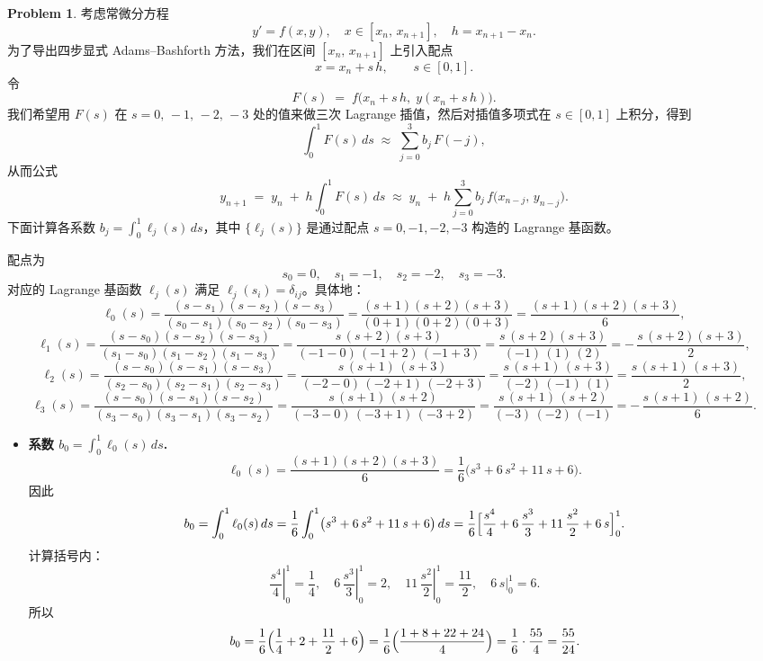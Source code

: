 \documentclass[a4paper]{article}
\theoremstyle{definition}
\newtheorem{problem}{Problem}
\theoremstyle{plain}
\newcommand{\<}{\left<}
\renewcommand{\>}{\right>}
\numberwithin{equation}{problem}
\begin{document}
\begin{problem}
    考虑常微分方程 
\[
y' = f(x,y), \quad x \in [x_n,\,x_{n+1}], \quad h = x_{n+1} - x_n.
\]
为了导出四步显式 Adams–Bashforth 方法，我们在区间 $[x_n,\,x_{n+1}]$ 上引入配点
\[
x = x_n + s\,h,\qquad s \in [0,1].
\]
令
\[
F(s) \;=\; f\bigl(x_n + s\,h,\;y(x_n + s\,h)\bigr).
\]
我们希望用 $F(s)$ 在 $s = 0,\,-1,\,-2,\,-3$ 处的值来做三次 Lagrange 插值，然后对插值多项式在 $s\in[0,1]$ 上积分，得到
\[
\int_{0}^{1} F(s)\,ds
\;\approx\;
\sum_{j=0}^{3} b_j\,F(-\,j),
\]
从而公式
\[
y_{n+1} \;=\; y_n \;+\; h \int_{0}^{1} F(s)\,ds
\;\approx\;
y_n \;+\; h \sum_{j=0}^{3} b_j\,f\bigl(x_{n-j},\,y_{n-j}\bigr).
\]
下面计算各系数 $b_j = \displaystyle\int_{0}^{1} \ell_j(s)\,ds$，其中 $\{\ell_j(s)\}$ 是通过配点 $s=0,-1,-2,-3$ 构造的 Lagrange 基函数。

\medskip



配点为
\[
s_0 = 0,\quad s_1 = -1,\quad s_2 = -2,\quad s_3 = -3.
\]
对应的 Lagrange 基函数 $\ell_j(s)$ 满足 $\ell_j(s_i) = \delta_{ij}$。具体地：
\[
\ell_0(s)
= \frac{(s - s_1)(s - s_2)(s - s_3)}{(s_0 - s_1)(s_0 - s_2)(s_0 - s_3)}
= \frac{(s + 1)(s + 2)(s + 3)}{(0 + 1)(0 + 2)(0 + 3)}
= \frac{(s + 1)(s + 2)(s + 3)}{6},
\]
\[
\ell_1(s)
= \frac{(s - s_0)(s - s_2)(s - s_3)}{(s_1 - s_0)(s_1 - s_2)(s_1 - s_3)}
= \frac{s\,(s + 2)(s + 3)}{(-1 - 0)\,(-1 + 2)\,(-1 + 3)}
= \frac{s\,(s + 2)(s + 3)}{(-1)\,(1)\,(2)}
= -\,\frac{s\,(s + 2)(s + 3)}{2},
\]
\[
\ell_2(s)
= \frac{(s - s_0)(s - s_1)(s - s_3)}{(s_2 - s_0)(s_2 - s_1)(s_2 - s_3)}
= \frac{s\,(s + 1)\,(s + 3)}{(-2 - 0)\,(-2 + 1)\,(-2 + 3)}
= \frac{s\,(s + 1)\,(s + 3)}{(-2)\,(-1)\,(1)}
= \frac{s\,(s + 1)\,(s + 3)}{2},
\]
\[
\ell_3(s)
= \frac{(s - s_0)(s - s_1)(s - s_2)}{(s_3 - s_0)(s_3 - s_1)(s_3 - s_2)}
= \frac{s\,(s + 1)\,(s + 2)}{(-3 - 0)\,(-3 + 1)\,(-3 + 2)}
= \frac{s\,(s + 1)\,(s + 2)}{(-3)\,(-2)\,(-1)}
= -\,\frac{s\,(s + 1)\,(s + 2)}{6}.
\]

\medskip
 

\begin{itemize}
  \item \textbf{系数 $b_0 = \displaystyle\int_{0}^{1} \ell_0(s)\,ds$.}  
    \[
    \ell_0(s) = \frac{(s + 1)(s + 2)(s + 3)}{6}
    = \frac{1}{6}\bigl(s^3 + 6\,s^2 + 11\,s + 6\bigr).
    \]
    因此
    \[
    b_0 
    = \int_{0}^{1} \ell_0(s)\,ds
    = \frac{1}{6} \int_{0}^{1} \bigl(s^3 + 6\,s^2 + 11\,s + 6\bigr)\,ds
    = \frac{1}{6} \Bigl[
       \frac{s^4}{4} + 6\,\frac{s^3}{3} + 11\,\frac{s^2}{2} + 6\,s
    \Bigr]_{0}^{1}.
    \]
    计算括号内：
    \[
    \left.\frac{s^4}{4}\right|_{0}^{1} = \frac{1}{4},\quad
    \left.6\,\frac{s^3}{3}\right|_{0}^{1} = 2,\quad
    \left.11\,\frac{s^2}{2}\right|_{0}^{1} = \frac{11}{2},\quad
    \left.6\,s\right|_{0}^{1} = 6.
    \]
    所以
    \[
    b_0 
    = \frac{1}{6} \Bigl( \frac{1}{4} + 2 + \frac{11}{2} + 6 \Bigr)
    = \frac{1}{6} \Bigl( \frac{1 + 8 + 22 + 24}{4} \Bigr)
    = \frac{1}{6} \cdot \frac{55}{4}
    = \frac{55}{24}.
    \]
  

\end{itemize}
\end{problem}
\end{document}
